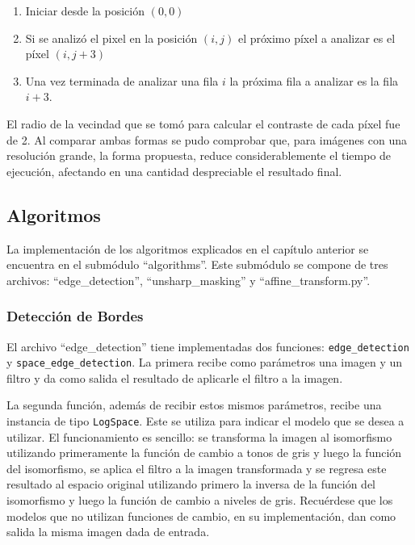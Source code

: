 \begin{enumerate}
	\item Iniciar desde la posici\'on $(0,0)$
	\item Si se analiz\'o el pixel en la posici\'on $(i,j)$ el pr\'oximo p\'ixel a analizar es el p\'ixel $(i,j+3)$
	\item Una vez terminada de analizar una fila $i$ la pr\'oxima fila a analizar es la fila $i+3$.
\end{enumerate}

El radio de la vecindad que se tom\'o para calcular el contraste de cada p\'ixel fue de 2. Al comparar ambas formas se pudo comprobar que, para im\'agenes con una resoluci\'on grande, la forma propuesta, reduce considerablemente el tiempo de ejecuci\'on, afectando en una cantidad despreciable el resultado final.

\subsection{Algoritmos}

La implementaci\'on de los algoritmos explicados en el cap\'itulo anterior se encuentra en el subm\'odulo ``algorithms''. Este subm\'odulo se compone de tres archivos: ``edge\_detection'', ``unsharp\_masking'' y ``affine\_transform.py''.

\subsubsection{Detecci\'on de Bordes}

El archivo ``edge\_detection'' tiene implementadas dos funciones: \verb|edge_detection| y \verb|space_edge_detection|. La primera recibe como par\'ametros una imagen y un filtro y da como salida el resultado de aplicarle el filtro a la imagen. 

La segunda funci\'on, adem\'as de recibir estos mismos par\'ametros, recibe una instancia de tipo \verb|LogSpace|. Este se utiliza para indicar el modelo que se desea a utilizar. El funcionamiento es sencillo: se transforma la imagen al isomorfismo utilizando primeramente la funci\'on de cambio a tonos de gris y luego la funci\'on del isomorfismo, se aplica el filtro a la imagen transformada y se regresa este resultado al espacio original utilizando primero la inversa de la funci\'on del isomorfismo y luego la funci\'on de cambio a niveles de gris. Recu\'erdese que los modelos que no utilizan funciones de cambio, en su implementaci\'on, dan como salida la misma imagen dada de entrada.

